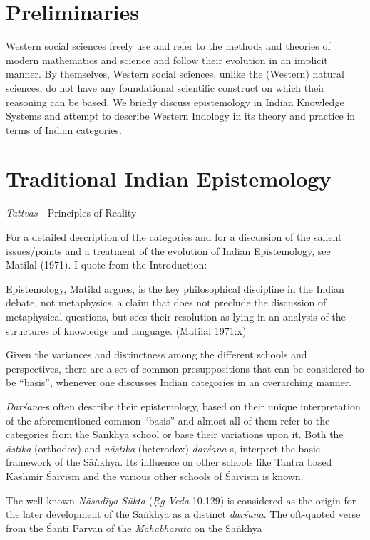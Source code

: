 \section*{Preliminaries}

Western social sciences freely use and refer to the methods and theories of modern mathematics and science and follow their evolution in an implicit manner.  By themselves, Western social sciences, unlike the (Western) natural sciences, do not have any foundational scientific construct on which their reasoning can be based. We briefly discuss epistemology in Indian Knowledge Systems and attempt to describe Western Indology in its theory and practice in terms of Indian categories.

\section*{Traditional Indian Epistemology}

{\sl Tattvas} - Principles of Reality

For a detailed description of the categories and for a discussion of the salient issues/points and a treatment of the evolution of Indian Epistemology, see Matilal (1971). I quote from the Introduction:
\begin{myquote}
Epistemology, Matilal argues, is the key philosophical discipline in the Indian debate, not metaphysics, a claim that does not preclude the discussion of metaphysical questions, but sees their resolution as lying in an analysis of the structures of knowledge and language. (Matilal 1971:x)
\end{myquote}

Given the variances and distinctness among the different schools and perspectives, there are a set of common presuppositions that can be considered to be ``basis'', whenever one discusses Indian categories in an overarching manner.

{\sl Darśana}-s often describe their epistemology, based on their unique interpretation of the aforementioned common ``basis'' and almost all of them refer to the categories from the Sāṅkhya school or base their variations upon it. Both the {\sl āstika} (orthodox) and {\sl nāstika} (heterodox) {\sl darśana}-s, interpret the basic framework of the Sāṅkhya. Its influence on other schools like Tantra based Kashmir Śaivism and the various other schools of Śaivism is known.

The well-known {\sl Nāsadīya Sūkta} ({\sl Ṛg Veda} 10.129) is considered as the origin for the later development of the Sāṅkhya as a distinct {\sl darśana}. The oft-quoted verse from the Śānti Parvan of the {\sl Mahābhārata} on the Sāṅkhya

